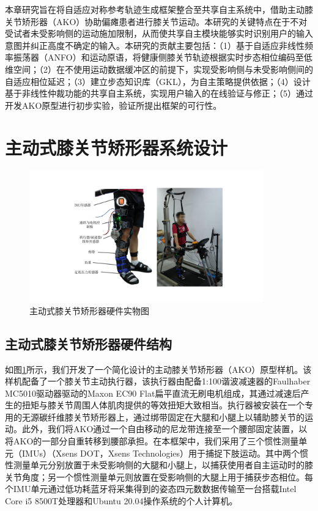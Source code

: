本章研究旨在将自适应对称参考轨迹生成框架整合至共享自主系统中，借助主动膝关节矫形器（AKO）协助偏瘫患者进行膝关节运动。本研究的关键特点在于不对受试者未受影响侧的运动施加限制，从而使共享自主模块能够实时识别用户的输入意图并纠正高度不确定的输入。本研究的贡献主要包括：（1）基于自适应非线性频率振荡器（ANFO）和运动原语，将健康侧膝关节轨迹根据实时步态相位编码至低维空间；（2）在不使用运动数据缓冲区的前提下，实现受影响侧与未受影响侧间的自适应相位延迟；（3）建立步态知识库（GKL），为自主策略提供依据；（4）设计基于非线性仲裁功能的共享自主系统，实现用户输入的在线验证与修正；（5）通过开发AKO原型进行初步实验，验证所提出框架的可行性。

\section{主动式膝关节矫形器系统设计}
\begin{figure}[!t]
  \centering\includegraphics[width=0.9\textwidth]{figures/5-Fig-1.pdf}
  \caption{主动式膝关节矫形器硬件实物图}
  \label{fig:5-1}
\end{figure}
\subsection{主动式膝关节矫形器硬件结构}
如图\ref{fig:5-1}所示，我们开发了一个简化设计的主动膝关节矫形器（AKO）原型样机。该样机配备了一个膝关节主动执行器，该执行器由配备1:100谐波减速器的Faulhaber MC5010驱动器驱动的Maxon EC90 Flat扁平直流无刷电机组成，其通过减速后产生的扭矩与膝关节周围人体肌肉提供的等效扭矩大致相当。执行器被安装在一个专用的无源碳纤维膝关节矫形器上，通过绑带固定在大腿和小腿上以辅助膝关节的运动。此外，我们将AKO通过一个自由移动的尼龙带连接至一个腰部固定装置，以将AKO的一部分自重转移到腰部承担。在本框架中，我们采用了三个惯性测量单元（IMUs）（Xsens DOT，Xsens Technologies）用于捕捉下肢运动。其中两个惯性测量单元分别放置于未受影响侧的大腿和小腿上，以捕获使用者自主运动时的膝关节角度；另一个惯性测量单元则放置在受影响侧的大腿上用于捕获步态相位。每个IMU单元通过低功耗蓝牙将采集得到的姿态四元数数据传输至一台搭载Intel Core i5 8500T处理器和Ubuntu 20.04操作系统的个人计算机。

